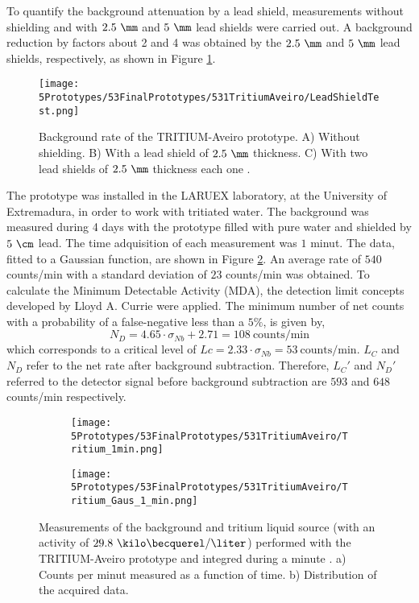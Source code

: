 To quantify the background attenuation by a lead shield, measurements without shielding and with $2.5~\mm$ and $5~\mm$ lead shields were carried out. A background reduction by factors about 2 and 4 was obtained by the $2.5~\mm$ and $5~\mm$ lead shields, respectively, as shown in Figure \ref{fig:LeadShieldTest}.
\begin{figure}[h]
\centering
\texttt{[image: 5Prototypes/53FinalPrototypes/531TritiumAveiro/LeadShieldTest.png]}
\caption{Background rate of the TRITIUM-Aveiro prototype. A) Without shielding. B) With a lead shield of $2.5~\mm$ thickness. C) With two lead shields of $2.5~\mm$ thickness each one \cite{ExperimentalPaperCarlos}.\label{fig:LeadShieldTest}}
\end{figure}
The prototype was installed in the LARUEX laboratory, at the University of Extremadura, in order to work with tritiated water. The background was measured during 4 days with the prototype filled with pure water and shielded by $5~\cm$ lead. The time adquisition of each measurement was $1$ minut. The data, fitted to a Gaussian function, are shown in Figure \ref{subfig:MeasurementInRealTime}. An average rate of $540$ counts/min with a standard deviation of $23$ counts/min was obtained. To calculate the Minimum Detectable Activity (MDA), the detection limit concepts developed by Lloyd A. Currie \cite{CurieLimit} were applied. The minimum number of net counts with a probability of a false-negative less than a $5\%$, is given by,
\begin{equation}
N_D = 4.65 \cdot{}\sigma_{Nb} + 2.71 = 108~\text{counts/min}
\label{eq:EquationNetCounts}
\end{equation}
which corresponds to a critical level of $Lc = 2.33\cdot{}\sigma_{Nb}=53 ~\text{counts/min}$. $L_C$ and $N_D$ refer to the net rate after background subtraction. Therefore, $L_C'$ and $N_D'$ referred to the detector signal before background subtraction are $593$ and $648$ counts/min respectively.
\begin{figure}
\centering
    \begin{subfigure}[b]{0.45\textwidth}
    \centering
    \texttt{[image: 5Prototypes/53FinalPrototypes/531TritiumAveiro/Tritium\_1min.png]}  
    \caption{\label{subfig:MeasurementInRealTime}}
    \end{subfigure}
    \hfill
    \begin{subfigure}[b]{0.45\textwidth}
    \centering
    \texttt{[image: 5Prototypes/53FinalPrototypes/531TritiumAveiro/Tritium\_Gaus\_1\_min.png]}  
    \caption{\label{subfig:DistributionofMeasurement}}
    \end{subfigure}
 \caption{Measurements of the background and tritium liquid source (with an activity of $29.8~\kilo\becquerel/\liter$) performed with the TRITIUM-Aveiro prototype and integred during a minute \cite{ExperimentalPaperCarlos}. a) Counts per minut measured as a function of time. b) Distribution of the acquired data.}
 \label{fig:BackgroundTritium1min}
\end{figure}
